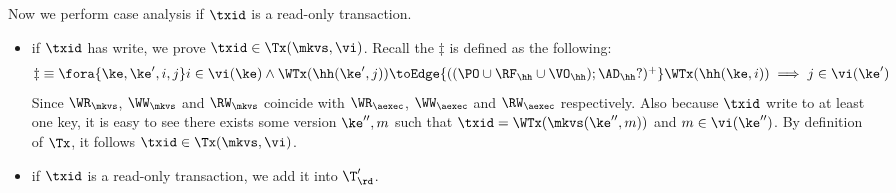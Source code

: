 \begin{itemize}
\begin{itemize}
Now we perform case analysis if \( \txid \) is a read-only transaction.
\begin{itemize}
    \item if \( \txid \) has write, we prove \( \txid \in \Tx(\mkvs, \vi)\).
        Recall the \( \ddagger \) is defined as the following:
        \begin{gather}
            \begin{array}{@{}l@{}}
                \ddagger \equiv 
                \fora{\ke, \ke', i, j}
                i \in \vi(\ke)
                \wedge \WTx(\hh(\ke', j))\toEdge{((\PO \cup \RF_{\hh} \cup \VO_{\hh}) ; \AD_{\hh}?)^{+}} \WTx(\hh(\ke, i))
                \implies j \in \vi(\ke')    
            \end{array} 
            \label{equ:si-dagger}
        \end{gather}
        Since \( \WR_\mkvs \), \( \WW_\mkvs \) and \( \RW_\mkvs \) coincide with
        \( \WR_\aexec \), \( \WW_\aexec \) and \( \RW_\aexec \) respectively.
        Also because \( \txid \) write to at least one key,
        it is easy to see there exists some version \( \ke'',m\) such that 
        \( \txid = \WTx(\mkvs(\ke'',m))\) and \( m \in \vi(\ke'')\).
        By definition of \( \Tx \), it follows \( \txid \in \Tx(\mkvs, \vi) \).
    \item if \( \txid \) is a read-only transaction, we add it into \( \T'_\rd \).
\end{itemize}


\end{itemize}
\end{itemize}

